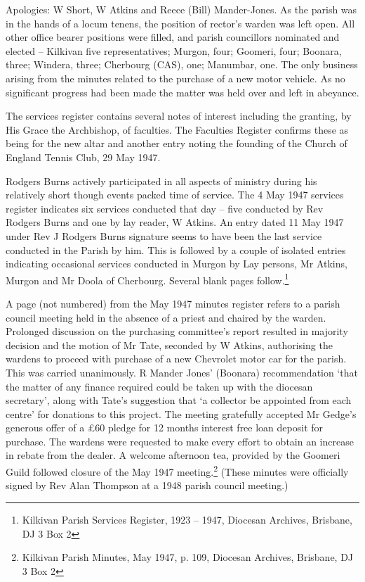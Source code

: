 Apologies: W Short, W Atkins and Reece (Bill) Mander-Jones. As the parish was in the hands of a locum tenens, the position of rector's warden was left open. All other office bearer positions were filled, and parish councillors nominated and elected -- Kilkivan five representatives; Murgon, four; Goomeri, four; Boonara, three; Windera, three; Cherbourg (CAS), one; Manumbar, one. The only business arising from the minutes related to the purchase of a new motor vehicle. As no significant progress had been made the matter was held over and left in abeyance.



The services register contains several notes of interest including the granting, by His Grace the Archbishop, of faculties. The Faculties Register confirms these as being for the new altar and another entry noting the founding of the Church of England Tennis Club, 29 May 1947.



Rodgers Burns actively participated in all aspects of ministry during his relatively short though events packed time of service. The 4 May 1947 services register indicates six services conducted that day -- five conducted by Rev Rodgers Burns and one by lay reader, W Atkins. An entry dated 11 May 1947 under Rev J Rodgers Burns signature seems to have been the last service conducted in the Parish by him. This is followed by a couple of isolated entries indicating occasional services conducted in Murgon by Lay persons, Mr Atkins, Murgon and Mr Doola of Cherbourg. Several blank pages follow.\footnote{Kilkivan Parish Services Register, 1923 -- 1947, Diocesan Archives, Brisbane, DJ 3 Box 2}


A page (not numbered) from the May 1947 minutes register refers to a parish council meeting held in the absence of a priest and chaired by the warden. Prolonged discussion on the purchasing committee's report resulted in majority decision and the motion of Mr Tate, seconded by W Atkins, authorising the wardens to proceed with purchase of a new Chevrolet motor car for the parish. This was carried unanimously. R Mander Jones' (Boonara) recommendation `that the matter of any finance required could be taken up with the diocesan secretary', along with Tate's suggestion that `a collector be appointed from each centre' for donations to this project. The meeting gratefully accepted Mr Gedge's generous offer of a \pounds60 pledge for 12 months interest free loan deposit for purchase. The wardens were requested to make every effort to obtain an increase in rebate from the dealer. A welcome afternoon tea, provided by the Goomeri Guild followed closure of the May 1947 meeting.\footnote{Kilkivan Parish Minutes, May 1947, p. 109, Diocesan Archives, Brisbane, DJ 3 Box 2} (These minutes were officially signed by Rev Alan Thompson at a 1948 parish council meeting.)


